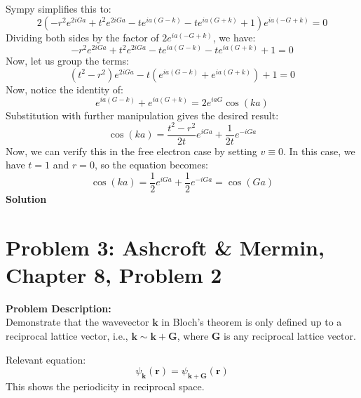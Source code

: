 \documentclass[12pt]{article}
\begin{document}
Sympy simplifies this to:
\begin{equation}
    2 \left(- r^{2} e^{2 i G a} + t^{2} e^{2 i G a} - t e^{i a \left(G - k\right)} - t e^{i a \left(G + k\right)} + 1\right) e^{i a \left(- G + k\right)} = 0
\end{equation}
Dividing both sides by the factor of $2e^{i a \left(- G + k\right)}$, we have:
\begin{equation}
    - r^{2} e^{2 i G a} + t^{2} e^{2 i G a} - t e^{i a \left(G - k\right)} - t e^{i a \left(G + k\right)} + 1 = 0
\end{equation}
Now, let us group the terms:
\begin{equation}
    \left(t^{2} - r^{2}\right) e^{2 i G a} - t \left(e^{i a \left(G - k\right)} + e^{i a \left(G + k\right)}\right) + 1 = 0
\end{equation}
Now, notice the identity of:
\begin{equation}
    e^{i a \left(G - k\right)} + e^{i a \left(G + k\right)} = 2e^{i a G} \cos(ka)
\end{equation}
Substitution with further manipulation gives the desired result:
\begin{equation}
    \cos(ka) = \frac{t^2 - r^2}{2t} e^{iGa} + \frac{1}{2t} e^{-iGa}
\end{equation}
Now, we can verify this in the free electron case by setting $v\equiv 0$. In this case, we have $t=1$ and $r=0$, so the equation becomes:
\begin{equation}
    \cos(ka) = \frac{1}{2} e^{iGa} + \frac{1}{2} e^{-iGa} = \cos(Ga)
\end{equation}
\vspace{2em}
\noindent \textbf{Solution} \\
\vspace{10em}

\section*{Problem 3: Ashcroft \& Mermin, Chapter 8, Problem 2}
\noindent \textbf{Problem Description:} \\
Demonstrate that the wavevector \( \mathbf{k} \) in Bloch's theorem is only defined up to a reciprocal lattice vector, i.e., \( \mathbf{k} \sim \mathbf{k} + \mathbf{G} \), where \( \mathbf{G} \) is any reciprocal lattice vector.

Relevant equation:
\begin{equation}
\psi_{\mathbf{k}}(\mathbf{r}) = \psi_{\mathbf{k} + \mathbf{G}}(\mathbf{r})
\end{equation}
This shows the periodicity in reciprocal space.
\end{document}
